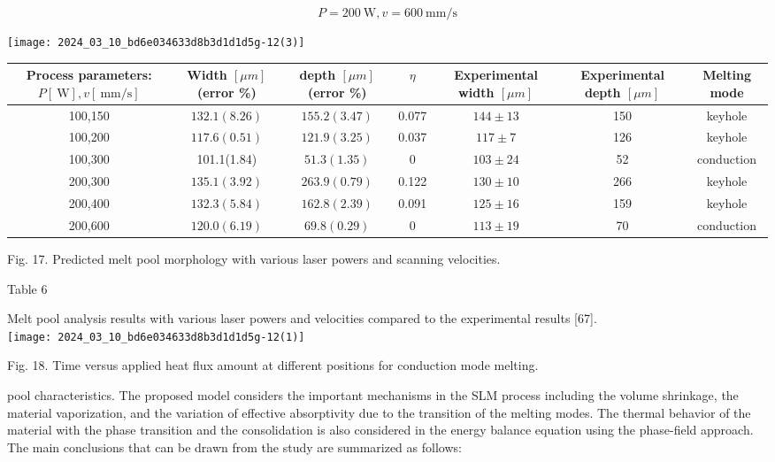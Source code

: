 \documentclass[10pt]{article}
\begin{document}
$$
P=200 \mathrm{~W}, v=600 \mathrm{~mm} / \mathrm{s}
$$

\begin{center}
\texttt{[image: 2024\_03\_10\_bd6e034633d8b3d1d1d5g-12(3)]}
\end{center}

\begin{center}
\begin{tabular}{|c|c|c|c|c|c|c|}
\hline
Process parameters: $P[\mathrm{~W}], v[\mathrm{~mm} / \mathrm{s}]$ & Width $[\mu m]$ (error \%) & depth $[\mu m]$ (error \%) & $\eta$ & Experimental width $[\mu m]$ & Experimental depth $[\mu m]$ & Melting mode \\
\hline
100,150 & $132.1(8.26)$ & $155.2(3.47)$ & 0.077 & $144 \pm 13$ & 150 & keyhole \\
\hline
100,200 & $117.6(0.51)$ & $121.9(3.25)$ & 0.037 & $117 \pm 7$ & 126 & keyhole \\
\hline
100,300 & 101.1(1.84) & $51.3(1.35)$ & 0 & $103 \pm 24$ & 52 & conduction \\
\hline
200,300 & $135.1(3.92)$ & $263.9(0.79)$ & 0.122 & $130 \pm 10$ & 266 & keyhole \\
\hline
200,400 & $132.3(5.84)$ & $162.8(2.39)$ & 0.091 & $125 \pm 16$ & 159 & keyhole \\
\hline
200,600 & $120.0(6.19)$ & $69.8(0.29)$ & 0 & $113 \pm 19$ & 70 & conduction \\
\hline
\end{tabular}
\end{center}

Fig. 17. Predicted melt pool morphology with various laser powers and scanning velocities.

Table 6

Melt pool analysis results with various laser powers and velocities compared to the experimental results [67].\\
\texttt{[image: 2024\_03\_10\_bd6e034633d8b3d1d1d5g-12(1)]}

Fig. 18. Time versus applied heat flux amount at different positions for conduction mode melting.

pool characteristics. The proposed model considers the important mechanisms in the SLM process including the volume shrinkage, the material vaporization, and the variation of effective absorptivity due to the transition of the melting modes. The thermal behavior of the material with the phase transition and the consolidation is also considered in the energy balance equation using the phase-field approach. The main conclusions that can be drawn from the study are summarized as follows:
\end{document}
